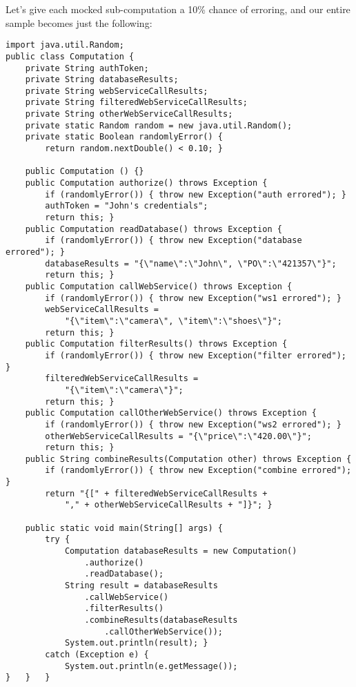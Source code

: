 \documentclass[11pt]{article}
\begin{document}
Let's give each mocked sub-computation a \mbox{10\%} chance of
erroring, and our entire sample becomes just the following:

\begin{verbatim}
import java.util.Random;
public class Computation {
    private String authToken;
    private String databaseResults;
    private String webServiceCallResults;
    private String filteredWebServiceCallResults;
    private String otherWebServiceCallResults;
    private static Random random = new java.util.Random();
    private static Boolean randomlyError() {
        return random.nextDouble() < 0.10; }

    public Computation () {}
    public Computation authorize() throws Exception {
        if (randomlyError()) { throw new Exception("auth errored"); }
        authToken = "John's credentials";
        return this; }
    public Computation readDatabase() throws Exception {
        if (randomlyError()) { throw new Exception("database errored"); }
        databaseResults = "{\"name\":\"John\", \"PO\":\"421357\"}";
        return this; }
    public Computation callWebService() throws Exception {
        if (randomlyError()) { throw new Exception("ws1 errored"); }
        webServiceCallResults =
            "{\"item\":\"camera\", \"item\":\"shoes\"}";
        return this; }
    public Computation filterResults() throws Exception {
        if (randomlyError()) { throw new Exception("filter errored"); }
        filteredWebServiceCallResults =
            "{\"item\":\"camera\"}";
        return this; }
    public Computation callOtherWebService() throws Exception {
        if (randomlyError()) { throw new Exception("ws2 errored"); }
        otherWebServiceCallResults = "{\"price\":\"420.00\"}";
        return this; }
    public String combineResults(Computation other) throws Exception {
        if (randomlyError()) { throw new Exception("combine errored"); }
        return "{[" + filteredWebServiceCallResults +
            "," + otherWebServiceCallResults + "]}"; }

    public static void main(String[] args) {
        try {
            Computation databaseResults = new Computation()
                .authorize()
                .readDatabase();
            String result = databaseResults
                .callWebService()
                .filterResults()
                .combineResults(databaseResults
                    .callOtherWebService());
            System.out.println(result); }
        catch (Exception e) {
            System.out.println(e.getMessage());
}   }   }
\end{verbatim}
\end{document}
